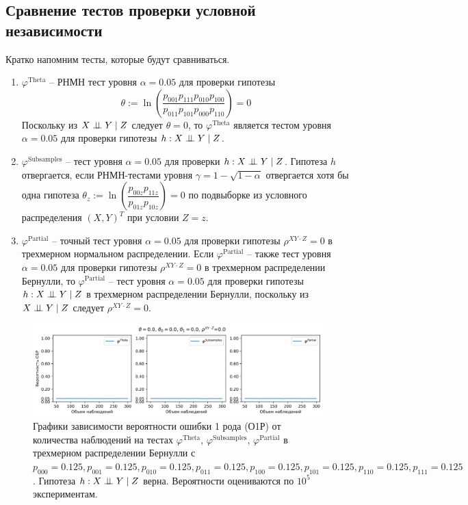 \begin{centering}
    \subsection{Сравнение тестов проверки условной независимости}\label{numerical_exp}
\end{centering}
Кратко напомним тесты, которые будут сравниваться.
\begin{enumerate}
    \item $\varphi^{\text{Theta}}$ -- РНМН тест уровня 
    $\alpha=0.05$ для проверки гипотезы 
     $$\theta := \ln  \left(\dfrac{p_{001}p_{111}p_{010}p_{100}}{p_{011}p_{101}p_{000}p_{110}}\right)=0$$
    Поскольку из $X \perp\!\!\!\perp Y \mid Z$ следует $\theta=0$, 
    то $\varphi^{\text{Theta}}$ является тестом уровня $\alpha=0.05$ для проверки
    гипотезы $h:X \perp\!\!\!\perp Y \mid Z$.
    \item $\varphi^{\text{Subsamples}}$ -- тест уровня $\alpha=0.05$
    для проверки $h: X \perp\!\!\!\perp Y \mid Z$.
    Гипотеза $h$ отвергается, если РНМН-тестами уровня 
    $\gamma=1-\sqrt{1-\alpha}$
    отвергается хотя бы 
    одна гипотеза 
    $\theta_z := \ln\left(\dfrac{p_{00z}p_{11z}}{p_{01z}p_{10z}}\right)=0$
    по подвыборке из условного распределения $(X,Y)^T$ при условии $Z=z$.
    \item $\varphi^{\text{Partial}}$ -- точный тест уровня $\alpha=0.05$
    для проверки гипотезы $\rho^{XY\cdot Z}=0$ в трехмерном нормальном распределении.
    Если $\varphi^{\text{Partial}}$ -- также тест
    уровня $\alpha=0.05$ для проверки гипотезы $\rho^{XY\cdot Z}=0$ в трехмерном распределении Бернулли, 
    то $\varphi^{\text{Partial}}$ -- тест уровня $\alpha=0.05$ для проверки
    гипотезы $h:X \perp\!\!\!\perp Y \mid Z$ в трехмерном распределении Бернулли,
    поскольку из $X \perp\!\!\!\perp Y \mid Z$ следует $\rho^{XY\cdot Z}=0$.
\end{enumerate}

\begin{figure}[H]
    \centering
    \includegraphics[scale=0.55]{images/graph1.png}
    \caption{Графики зависимости вероятности ошибки 1 рода (О1Р) от количества наблюдений
    на тестах $\varphi^{\text{Theta}}$, $\varphi^{\text{Subsamples}}$, $\varphi^{\text{Partial}}$
    в трехмерном распределении Бернулли с $p_{000}=0.125, p_{001}=0.125, p_{010}=0.125, p_{011}=0.125,
    p_{100}=0.125, p_{101}=0.125, p_{110}=0.125, p_{111}=0.125$. 
    Гипотеза $h: X \perp\!\!\!\perp Y \mid Z$ верна.
    Вероятности оцениваются по $10^5$ экспериментам.} \label{fig:1}
\end{figure}
    

